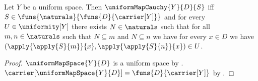 \begin{theorem}\label{uniform_map_cauchy_iff_entourages}
    Let $Y$ be a uniform space.
    Then $\uniformMapCauchy{Y}{D}{S}$ iff
        $S\in\funs{\naturals}{\funs{D}{\carrier[Y]}}$ and for every
        $U\in\uniformity[Y]$ there exists $N\in\naturals$ such that for all
        $m,n\in\naturals$ such that $N\subseteq m$ and $N\subseteq n$ we
        have for every $x\in D$ we have
            $(\apply{\apply{S}{m}}{x},
             \apply{\apply{S}{n}}{x})\in U$.
\end{theorem}
\begin{proof}
    $\uniformMapSpace{Y}{D}$ is a uniform space by
        .
    $\carrier[\uniformMapSpace{Y}{D}]=\funs{D}{\carrier[Y]}$ by
        .


\end{proof}
